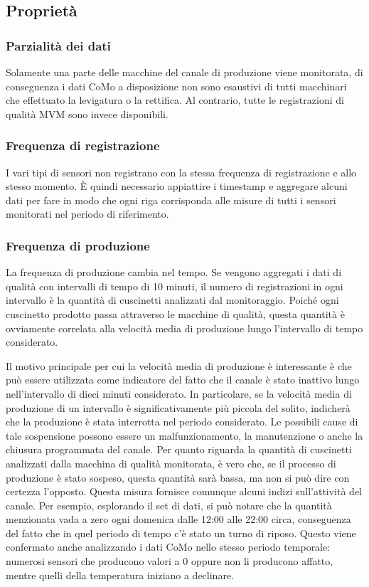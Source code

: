 \subsection{Proprietà}

\subsubsection{Parzialità dei dati}
Solamente una parte delle macchine del canale di produzione viene monitorata, di conseguenza i dati CoMo a disposizione non sono esaustivi di tutti macchinari che effettuato la levigatura o la rettifica. Al contrario, tutte le registrazioni di qualità MVM sono invece disponibili.

\subsubsection{Frequenza di registrazione}
I vari tipi di sensori non registrano con la stessa frequenza di registrazione e allo stesso momento.
È quindi necessario appiattire i timestamp e aggregare alcuni dati per fare in modo che ogni riga corrisponda alle misure di tutti i sensori monitorati nel periodo di riferimento.


\subsubsection{Frequenza di produzione}
La frequenza di produzione cambia nel tempo. Se vengono aggregati i dati di qualità con intervalli di tempo di 10 minuti, il numero di registrazioni in ogni intervallo è la quantità di cuscinetti analizzati dal monitoraggio.
Poiché ogni cuscinetto prodotto passa attraverso le macchine di qualità, questa quantità è ovviamente correlata alla velocità media di produzione
lungo l'intervallo di tempo considerato. 

Il motivo principale per cui la velocità media di produzione è interessante è che può essere utilizzata come indicatore del fatto che il canale è stato inattivo lungo nell'intervallo di dieci minuti considerato. In particolare, se la velocità media di produzione di un intervallo è significativamente più piccola del solito, indicherà che la produzione è stata interrotta nel periodo considerato. Le possibili cause di tale sospensione possono essere un malfunzionamento, la manutenzione o anche la chiusura programmata del canale.
Per quanto riguarda la quantità di cuscinetti analizzati dalla macchina di qualità monitorata, è vero che, se il processo di produzione è stato sospeso, questa quantità sarà bassa, ma non si può dire con certezza l'opposto.
Questa misura fornisce comunque alcuni indizi sull'attività del canale. Per esempio, esplorando il set di dati, si può notare che la quantità menzionata vada a zero ogni domenica dalle 12:00 alle 22:00 circa, conseguenza del fatto che in quel periodo di tempo c'è stato un turno di riposo. Questo viene confermato anche analizzando i dati CoMo nello stesso periodo temporale: numerosi sensori che producono valori a 0 oppure non li producono affatto, mentre quelli della temperatura iniziano a declinare. 


